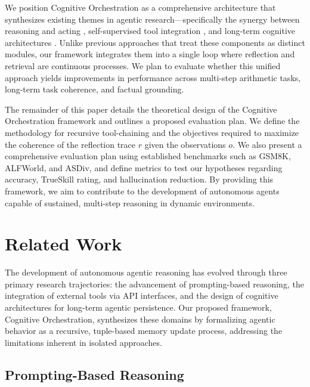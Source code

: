 \documentclass[11pt,a4paper]{article}
\begin{document}
We position Cognitive Orchestration as a comprehensive architecture that synthesizes existing themes in agentic research---specifically the synergy between reasoning and acting \cite{wei2022}, self-supervised tool integration \cite{schick2023}, and long-term cognitive architectures \cite{park2023}. Unlike previous approaches that treat these components as distinct modules, our framework integrates them into a single loop where reflection and retrieval are continuous processes. We plan to evaluate whether this unified approach yields improvements in performance across multi-step arithmetic tasks, long-term task coherence, and factual grounding.

The remainder of this paper details the theoretical design of the Cognitive Orchestration framework and outlines a proposed evaluation plan. We define the methodology for recursive tool-chaining and the objectives required to maximize the coherence of the reflection trace $r$ given the observations $o$. We also present a comprehensive evaluation plan using established benchmarks such as GSM8K, ALFWorld, and ASDiv, and define metrics to test our hypotheses regarding accuracy, TrueSkill rating, and hallucination reduction. By providing this framework, we aim to contribute to the development of autonomous agents capable of sustained, multi-step reasoning in dynamic environments.

\section{Related Work}
The development of autonomous agentic reasoning has evolved through three primary research trajectories: the advancement of prompting-based reasoning, the integration of external tools via API interfaces, and the design of cognitive architectures for long-term agentic persistence. Our proposed framework, Cognitive Orchestration, synthesizes these domains by formalizing agentic behavior as a recursive, tuple-based memory update process, addressing the limitations inherent in isolated approaches.

\subsection{Prompting-Based Reasoning}
\end{document}
